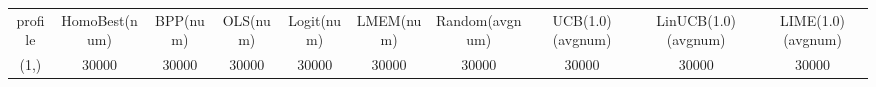 \begin{tabular}{cccccccccc}
profile & HomoBest(num) & BPP(num) & OLS(num) & Logit(num) & LMEM(num) & Random(avgnum) & UCB(1.0)(avgnum) & LinUCB(1.0)(avgnum) & LIME(1.0)(avgnum)\\
(1,) & 30000 & 30000 & 30000 & 30000 & 30000 & 30000 & 30000 & 30000 & 30000\\
\end{tabular}
